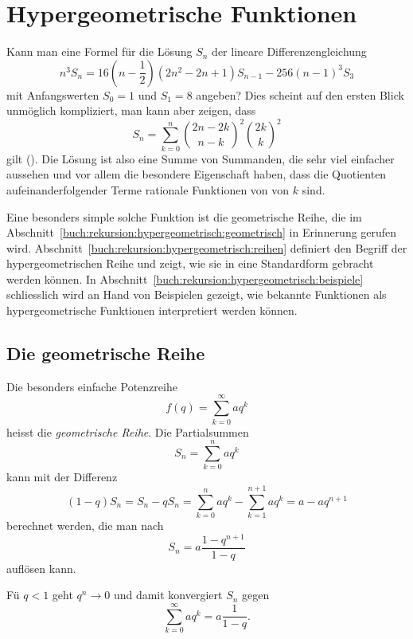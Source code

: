 %
%
%
\section{Hypergeometrische Funktionen
\label{buch:rekursion:section:hypergeometrische-funktion}}
Kann man eine Formel für die Lösung $S_n$ der lineare Differenzengleichung
\[
n^3S_{n}
=
16(n-{\textstyle\frac12})(2n^2-2n+1)S_{n-1}
-256(n-1)^3S_3
\]
mit Anfangswerten $S_0=1$ und $S_1=8$ angeben?
Dies scheint auf den ersten Blick unmöglich kompliziert, man kann aber
zeigen, dass
\[
S_n
=
\sum_{k=0}^n 
\binom{2n-2k}{n-k}^2 \binom{2k}{k}^2
\]
gilt (\cite[p.~xi]{buch:ab}).
Die Lösung ist also eine Summe von Summanden, die sehr viel einfacher
aussehen und vor allem die besondere Eigenschaft haben, dass die
Quotienten aufeinanderfolgender Terme rationale Funktionen von von $k$
sind.

Eine besonders simple solche Funktion ist die geometrische Reihe, die
im Abschnitt~\ref{buch:rekursion:hypergeometrisch:geometrisch}
in Erinnerung gerufen wird.
Abschnitt~\ref{buch:rekursion:hypergeometrisch:reihen}
definiert den Begriff der hypergeometrischen Reihe und zeigt, 
wie sie in eine Standardform gebracht werden können.
In Abschnitt~\ref{buch:rekursion:hypergeometrisch:beispiele}
schliesslich wird an Hand von Beispielen gezeigt, wie bekannte
Funktionen als hypergeometrische Funktionen interpretiert werden können.

\subsection{Die geometrische Reihe
\label{buch:rekursion:hypergeometrisch:geometrisch}}
Die besonders einfache Potenzreihe
\[
f(q)
=
\sum_{k=0}^\infty aq^k
\]
heisst die {\em geometrische Reihe}.
Die Partialsummen 
\[
S_n
=
\sum_{k=0}^n aq^k
\]
kann mit der Differenz
\begin{equation}
(1-q)S_n
=
S_n - qS_n
=
\sum_{k=0}^n aq^k
-
\sum_{k=1}^{n+1} aq^k
=
a -aq^{n+1}
\label{buch:rekursion:hypergeometrisch:eqn:qsumme}
\end{equation}
berechnet werden, die man nach
\begin{equation}
S_n 
=
a\frac{1-q^{n+1}}{1-q}
\label{buch:rekursion:hypergeometrisch:eqn:geomsumme}
\end{equation}
auflösen kann.

Fü $q<1$ geht $q^n\to 0$ und damit konvergiert
$S_n$  gegen
\[
\sum_{k=0}^\infty aq^k
=
a\frac{1}{1-q}.
\]

